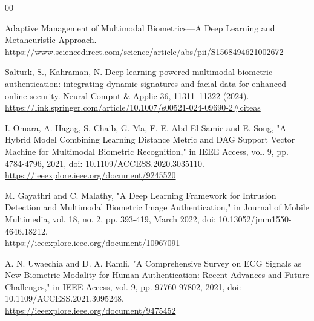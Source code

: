 \documentclass[12pt,a4paper]{report}
\begin{document}
\begin{thebibliography}{00}
\newpage

 Adaptive Management of Multimodal Biometrics—A Deep Learning and Metaheuristic Approach. \\
\url{https://www.sciencedirect.com/science/article/abs/pii/S1568494621002672}

 Salturk, S., Kahraman, N. Deep learning-powered multimodal biometric authentication: integrating dynamic signatures and facial data for enhanced online security. Neural Comput & Applic 36, 11311–11322 (2024). \\
\url{https://link.springer.com/article/10.1007/s00521-024-09690-2#citeas}

 I. Omara, A. Hagag, S. Chaib, G. Ma, F. E. Abd El-Samie and E. Song, "A Hybrid Model Combining Learning Distance Metric and DAG Support Vector Machine for Multimodal Biometric Recognition," in IEEE Access, vol. 9, pp. 4784-4796, 2021, doi: 10.1109/ACCESS.2020.3035110. \\
\url{https://ieeexplore.ieee.org/document/9245520}

 M. Gayathri and C. Malathy, "A Deep Learning Framework for Intrusion Detection and Multimodal Biometric Image Authentication," in Journal of Mobile Multimedia, vol. 18, no. 2, pp. 393-419, March 2022, doi: 10.13052/jmm1550-4646.18212. \\
\url{https://ieeexplore.ieee.org/document/10967091}

 A. N. Uwaechia and D. A. Ramli, "A Comprehensive Survey on ECG Signals as New Biometric Modality for Human Authentication: Recent Advances and Future Challenges," in IEEE Access, vol. 9, pp. 97760-97802, 2021, doi: 10.1109/ACCESS.2021.3095248. \\
\url{https://ieeexplore.ieee.org/document/9475452}
\end{thebibliography}
\end{document}
